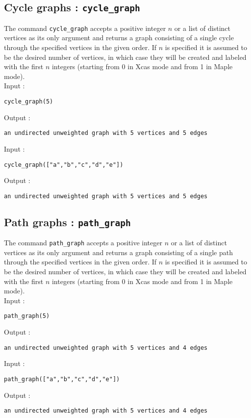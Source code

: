 \documentclass[a4paper,11pt]{article}
\begin{document}
\subsection{Cycle graphs : {\tt cycle\_graph}}

The command {\tt cycle\_graph} accepts a positive integer $ n $ or a list of distinct vertices as its only argument and returns a graph consisting of a single cycle through the specified vertices in the given order. If $ n $ is specified it is assumed to be the desired number of vertices, in which case they will be created and labeled with the first $ n $ integers (starting from 0 in Xcas mode and from 1 in Maple mode).\\
Input :
\begin{center}
  \tt cycle\_graph(5)
\end{center}
Output :
\begin{center}
  \tt an undirected unweighted graph with 5 vertices and 5 edges
\end{center}
Input :
\begin{center}
  \tt cycle\_graph(["a","b","c","d","e"])
\end{center}
Output :
\begin{center}
  \tt an undirected unweighted graph with 5 vertices and 5 edges
\end{center}

\subsection{Path graphs : {\tt path\_graph}}

The command {\tt path\_graph} accepts a positive integer $ n $ or a list of distinct vertices as its only argument and returns a graph consisting of a single path through the specified vertices in the given order. If $ n $ is specified it is assumed to be the desired number of vertices, in which case they will be created and labeled with the first $ n $ integers (starting from 0 in Xcas mode and from 1 in Maple mode).\\
Input :
\begin{center}
  \tt path\_graph(5)
\end{center}
Output :
\begin{center}
  \tt an undirected unweighted graph with 5 vertices and 4 edges
\end{center}
Input :
\begin{center}
  \tt path\_graph(["a","b","c","d","e"])
\end{center}
Output :
\begin{center}
  \tt an undirected unweighted graph with 5 vertices and 4 edges
\end{center}
\end{document}
